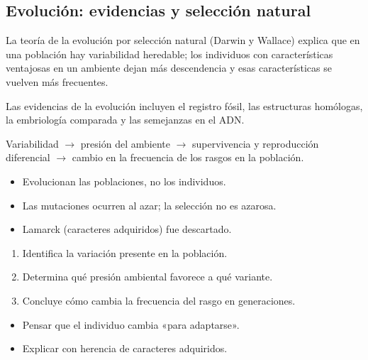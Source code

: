 \documentclass[10pt,a4paper,twocolumn]{article}
\begin{document}
\subsection{Evolución: evidencias y selección natural}

La teoría de la evolución por selección natural (Darwin y Wallace) explica que en una población hay variabilidad heredable; los individuos con características ventajosas en un ambiente dejan más descendencia y esas características se vuelven más frecuentes.

Las evidencias de la evolución incluyen el registro fósil, las estructuras homólogas, la embriología comparada y las semejanzas en el ADN.

\begin{mecanismo}
Variabilidad $\rightarrow$ presión del ambiente $\rightarrow$ supervivencia y reproducción diferencial $\rightarrow$ cambio en la frecuencia de los rasgos en la población.
\end{mecanismo}

\begin{ideasclave}
\begin{itemize}
  \item Evolucionan las poblaciones, no los individuos.
  \item Las mutaciones ocurren al azar; la selección no es azarosa.
  \item Lamarck (caracteres adquiridos) fue descartado.
\end{itemize}
\end{ideasclave}

\begin{metodo}
\begin{enumerate}
  \item Identifica la variación presente en la población.
  \item Determina qué presión ambiental favorece a qué variante.
  \item Concluye cómo cambia la frecuencia del rasgo en generaciones.
\end{enumerate}
\end{metodo}

\begin{errorfrecuente}
\begin{itemize}
  \item Pensar que el individuo cambia «para adaptarse».
  \item Explicar con herencia de caracteres adquiridos.
\end{itemize}
\end{errorfrecuente}
\end{document}
